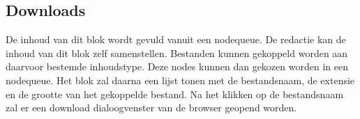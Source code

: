 \subsection{Downloads}
\label{sec:downloads}
De inhoud van dit blok wordt gevuld vanuit een nodequeue. De redactie kan de inhoud van dit blok zelf samenstellen. Bestanden kunnen gekoppeld worden aan daarvoor bestemde inhoudstype. Deze nodes kunnen dan gekozen worden in een nodequeue. Het blok zal daarna een lijst tonen met de bestandsnaam, de extensie en de grootte van het gekoppelde bestand. Na het klikken op de bestandsnaam zal er een download dialoogvenster van de browser geopend worden.